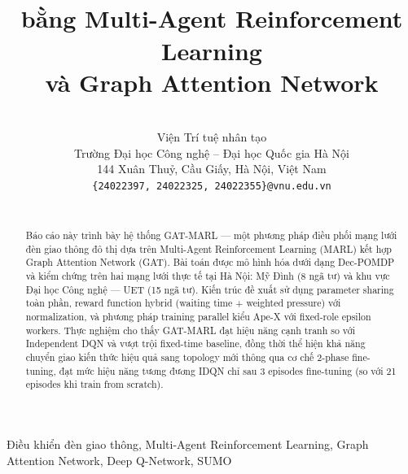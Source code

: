 \documentclass[conference]{IEEEtran}
\begin{document}
\title{ \\ 
bằng Multi-Agent Reinforcement Learning \\ 
và Graph Attention Network}

\author{
\\ Viện Trí tuệ nhân tạo \\
Trường Đại học Công nghệ -- Đại học Quốc gia Hà Nội \\
144 Xuân Thuỷ, Cầu Giấy, Hà Nội, Việt Nam \\
{\tt\small\{24022397, 24022325, 24022355\}@vnu.edu.vn} \\ \\
}

\maketitle

\begin{abstract}
Báo cáo này trình bày hệ thống GAT-MARL --- một phương pháp điều phối mạng lưới đèn giao thông đô thị dựa trên Multi-Agent Reinforcement Learning (MARL) kết hợp Graph Attention Network (GAT). Bài toán được mô hình hóa dưới dạng Dec-POMDP và kiểm chứng trên hai mạng lưới thực tế tại Hà Nội: Mỹ Đình (8 ngã tư) và khu vực Đại học Công nghệ --- UET (15 ngã tư). Kiến trúc đề xuất sử dụng parameter sharing toàn phần, reward function hybrid (waiting time + weighted pressure) với normalization, và phương pháp training parallel kiểu Ape-X với fixed-role epsilon workers. Thực nghiệm cho thấy GAT-MARL đạt hiệu năng cạnh tranh so với Independent DQN và vượt trội fixed-time baseline, đồng thời thể hiện khả năng chuyển giao kiến thức hiệu quả sang topology mới thông qua cơ chế 2-phase fine-tuning, đạt mức hiệu năng tương đương IDQN chỉ sau 3 episodes fine-tuning (so với 21 episodes khi train from scratch).
\end{abstract}

\begin{IEEEkeywords}
Điều khiển đèn giao thông, Multi-Agent Reinforcement Learning, Graph Attention Network, Deep Q-Network, SUMO
\end{IEEEkeywords}
\end{document}
